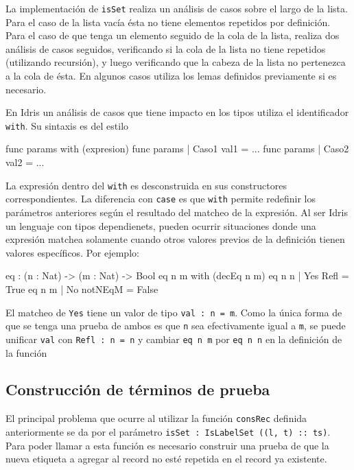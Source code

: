 La implementación de \texttt{isSet} realiza un análisis de casos sobre el largo de la lista. Para el caso de la lista vacía ésta no tiene elementos repetidos por definición. Para el caso de que tenga un elemento seguido de la cola de la lista, realiza dos análisis de casos seguidos, verificando si la cola de la lista no tiene repetidos (utilizando recursión), y luego verificando que la cabeza de la lista no pertenezca a la cola de ésta. En algunos casos utiliza los lemas definidos previamente si es necesario.

En Idris un análisis de casos que tiene impacto en los tipos utiliza el identificador \texttt{with}. Su sintaxis es del estilo

\begin{code}
func params with (expresion)
  func params | Caso1 val1 = ...
  func params | Caso2 val2 = ...
\end{code}

La expresión dentro del \texttt{with} es desconstruida en sus constructores correspondientes. La diferencia con \texttt{case} es que \texttt{with} permite redefinir los parámetros anteriores según el resultado del matcheo de la expresión. Al ser Idris un lenguaje con tipos dependienets, pueden ocurrir situaciones donde una expresión matchea solamente cuando otros valores previos de la definición tienen valores específicos. Por ejemplo:

\begin{code}
eq : (n : Nat) -> (m : Nat) -> Bool
eq n m with (decEq n m)
  eq n n | Yes Refl = True
  eq n m | No notNEqM = False
\end{code}

El matcheo de \texttt{Yes} tiene un valor de tipo \texttt{val : n = m}. Como la única forma de que se tenga una prueba de ambos es que \texttt{n} sea efectivamente igual a \texttt{m}, se puede unificar \texttt{val} con \texttt{Refl : n = n} y cambiar \texttt{eq n m} por \texttt{eq n n} en la definición de la función

\subsection{Construcción de términos de prueba}

El principal problema que ocurre al utilizar la función \texttt{consRec} definida anteriormente se da por el parámetro \texttt{isSet : IsLabelSet ((l, t) :: ts)}. Para poder llamar a esta función es necesario construir una prueba de que la nueva etiqueta a agregar al record no esté repetida en el record ya existente.

